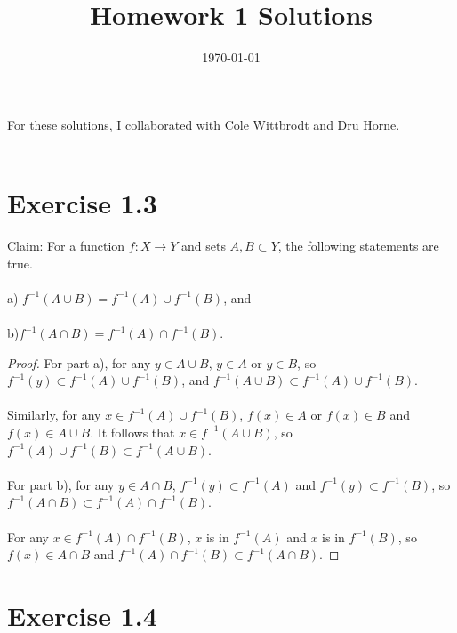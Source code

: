 \documentclass{article}
\title{\textbf{Homework 1 Solutions}}
\date{}
\date\today
\begin{document}
\maketitle %

\thispagestyle{firstpage}

For these solutions, I collaborated with Cole Wittbrodt and Dru Horne.\\ 
\\
\section*{Exercise 1.3}

Claim: For a function $f:X \rightarrow Y$ and sets $A, B \subset Y$, the following statements 
are true.\\
\\
a) $f^{-1}(A \cup B) = f^{-1}(A)\cup f^{-1}(B)$, and\\ 
\\ 
b)$f^{-1}(A \cap B) = f^{-1}(A)\cap f^{-1}(B)$.

\begin{proof}
    For part a), for any $y \in A \cup B$, $y \in A$ 
    or $y \in B$, so $f^{-1}(y) \subset f^{-1}(A) \cup f^{-1}(B)$, and 
    $f^{-1}(A \cup B) \subset f^{-1}(A) \cup f^{-1}(B)$. \\
    \\ 
    Similarly, for any $x \in f^{-1}(A) \cup f^{-1}(B)$, $f(x) \in A$ 
    or $f(x) \in B$ and $f(x) \in A \cup B$.  It follows that $x \in f^{-1}(A \cup B)$, 
    so $f^{-1}(A) \cup f^{-1}(B) \subset f^{-1}(A \cup B)$. \\ 
    \\ 
    For part b), for any $y \in A \cap B$, $f^{-1}(y) \subset f^{-1}(A)$ 
    and $f^{-1}(y) \subset f^{-1}(B)$, so $f^{-1}(A \cap B) \subset f^{-1}(A) \cap f^{-1}(B)$.\\ 
    \\ 
    For any $x \in f^{-1}(A) \cap f^{-1}(B)$, $x$ is in $f^{-1}(A)$ and $x$ is in $f^{-1}(B)$, 
    so $f(x) \in A \cap B$ and $f^{-1}(A) \cap f^{-1}(B) \subset f^{-1}(A \cap B)$.


\end{proof}

\section*{Exercise 1.4}
\end{document}
